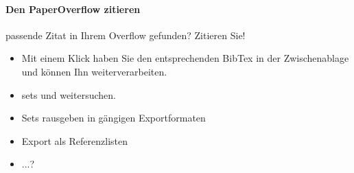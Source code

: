 \documentclass[a4paper,12pt]{article}
\begin{document}
\paragraph{Den PaperOverflow zitieren}
passende Zitat in Ihrem Overflow gefunden? Zitieren Sie! 
\begin{itemize}
	\item Mit einem Klick haben Sie den entsprechenden BibTex in der Zwischenablage und können Ihn weiterverarbeiten. 
	\item sets und weitersuchen.
	\item Sets rausgeben in gängigen Exportformaten 
	\item Export als Referenzlisten
	\item ...?
\end{itemize}

\end{document}
